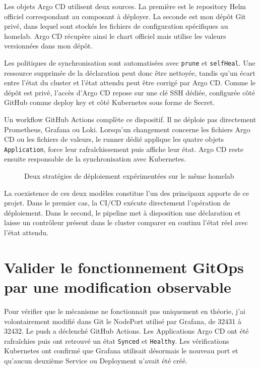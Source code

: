 Les objets Argo CD utilisent deux sources. La première est le repository Helm officiel correspondant au composant à déployer. La seconde est mon dépôt Git privé, dans lequel sont stockés les fichiers de configuration spécifiques au homelab. Argo CD récupère ainsi le chart officiel mais utilise les valeurs versionnées dans mon dépôt.

Les politiques de synchronisation sont automatisées avec \texttt{prune} et \texttt{selfHeal}. Une ressource supprimée de la déclaration peut donc être nettoyée, tandis qu'un écart entre l'état du cluster et l'état attendu peut être corrigé par Argo CD. Comme le dépôt est privé, l'accès d'Argo CD repose sur une clé SSH dédiée, configurée côté GitHub comme deploy key et côté Kubernetes sous forme de Secret.

Un workflow GitHub Actions complète ce dispositif. Il ne déploie pas directement Prometheus, Grafana ou Loki. Lorsqu'un changement concerne les fichiers Argo CD ou les fichiers de valeurs, le runner dédié applique les quatre objets \texttt{Application}, force leur rafraîchissement puis affiche leur état. Argo CD reste ensuite responsable de la synchronisation avec Kubernetes.

\begin{figure}[H]
\centering
{}
\caption{Deux stratégies de déploiement expérimentées sur le même homelab}
\label{fig:homelab-cd-gitops}
\end{figure}

La coexistence de ces deux modèles constitue l'un des principaux apports de ce projet. Dans le premier cas, la CI/CD exécute directement l'opération de déploiement. Dans le second, le pipeline met à disposition une déclaration et laisse un contrôleur présent dans le cluster comparer en continu l'état réel avec l'état attendu.

\section{Valider le fonctionnement GitOps par une modification observable}

Pour vérifier que le mécanisme ne fonctionnait pas uniquement en théorie, j'ai volontairement modifié dans Git le NodePort utilisé par Grafana, de 32431 à 32432. Le push a déclenché GitHub Actions. Les Applications Argo CD ont été rafraîchies puis ont retrouvé un état \texttt{Synced} et \texttt{Healthy}. Les vérifications Kubernetes ont confirmé que Grafana utilisait désormais le nouveau port et qu'aucun deuxième Service ou Deployment n'avait été créé.

